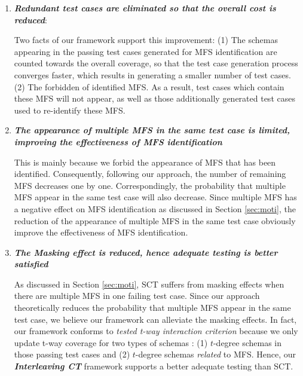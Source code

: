 \documentclass[10pt,journal,compsoc]{IEEEtran}
\begin{document}
 \begin{enumerate}
\item \emph{\textbf{Redundant test cases are eliminated so that the overall cost is reduced}}:

Two facts of our framework support this improvement: (1) The schemas appearing in the passing test cases generated for MFS identification are counted towards the overall coverage, so that the test case generation process converges faster, which results in generating a smaller number of test cases. (2) The forbidden of identified MFS. As a result, test cases which contain these MFS will not appear, as well as those additionally generated test cases used to re-identify these MFS.

\item \emph{\textbf{The appearance of multiple MFS in the same test case is limited, improving the effectiveness of MFS identification}}

This is mainly because we forbid the appearance of MFS that has been identified. Consequently, following our approach, the number of remaining MFS decreases one by one. Correspondingly, the probability that multiple MFS appear in the same test case will also decrease. Since multiple MFS has a negative effect on MFS identification as discussed in Section \ref{sec:moti}, the reduction of the appearance of multiple MFS in the same test case obviously improve the effectiveness of MFS identification.

\item \emph{\textbf{The Masking effect is reduced, hence adequate testing is better satisfied}}

As discussed in Section \ref{sec:moti}, SCT suffers from masking effects when there are multiple MFS in one failing test case. Since our approach theoretically reduces the probability that multiple MFS appear in the same test case, we believe our framework can alleviate the masking effects. In fact, our framework conforms to \emph{tested t-way interaction criterion} because we only update t-way coverage for two types of schemas : (1) $t$-degree schemas in those passing test cases and (2) $t$-degree schemas \emph{related} to MFS. Hence, our \emph{\textbf{Interleaving CT}} framework supports a better adequate testing than SCT.


%

 \end{enumerate}
\end{document}
